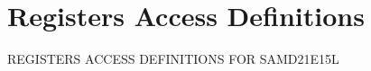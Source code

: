\hypertarget{group___s_a_m_d21_e15_l__reg}{}\section{Registers Access Definitions}
\label{group___s_a_m_d21_e15_l__reg}
R\+E\+G\+I\+S\+T\+E\+RS A\+C\+C\+E\+SS D\+E\+F\+I\+N\+I\+T\+I\+O\+NS F\+OR S\+A\+M\+D21\+E15L 